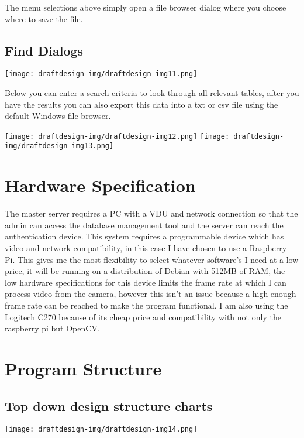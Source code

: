 \documentclass[12pt,a4paper]{report}
\begin{document}
{\centering
The menu selections above simply open a file browser dialog where you choose where to save the file.
\par}

\subsection[Find Dialogs]{Find Dialogs}
{\centering  \texttt{[image: draftdesign-img/draftdesign-img11.png]} \par}

Below you can enter a search criteria to look through all relevant tables, after you have the results you can also export this data into a txt or csv file using the default Windows file browser.

{\centering  \texttt{[image: draftdesign-img/draftdesign-img12.png]}  \texttt{[image: draftdesign-img/draftdesign-img13.png]} \par}

\section[Hardware Specification]{Hardware Specification}
The master server requires a PC with a VDU and network connection so that the admin can access the database management tool and the server can reach the authentication device.
This system requires a programmable device which has video and network compatibility, in this case I have chosen to use a Raspberry Pi. This gives me the most flexibility to select whatever software’s I need at a low price, it will be running on a distribution of Debian with 512MB of RAM, the low hardware specifications for this device limits the frame rate at which I can process video from the camera, however this isn’t an issue because a high enough frame rate can be reached to make the program functional. I am also using the Logitech C270 because of its cheap price and compatibility with not only the raspberry pi but OpenCV.

\section[Program Structure]{Program Structure}
\subsection[Top down design structure charts]{Top down design structure charts}

\texttt{[image: draftdesign-img/draftdesign-img14.png]}
\end{document}

